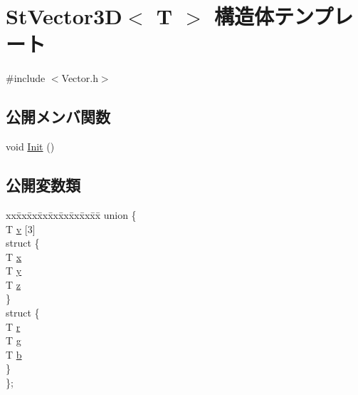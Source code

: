 \hypertarget{struct_st_vector3_d}{}\section{St\+Vector3\+D$<$ T $>$ 構造体テンプレート}
\label{struct_st_vector3_d}


{\ttfamily \#include $<$Vector.\+h$>$}

\subsection*{公開メンバ関数}
\begin{DoxyCompactItemize}
\item 
void \hyperlink{struct_st_vector3_d_a0dfe95d664c3a41ecbe08ffbeff55a46}{Init} ()
\end{DoxyCompactItemize}
\subsection*{公開変数類}
\begin{DoxyCompactItemize}
\item 
\begin{tabbing}
xx\=xx\=xx\=xx\=xx\=xx\=xx\=xx\=xx\=\kill
union \{\\
\>T \hyperlink{struct_st_vector3_d_abcad16bb72da516250165e2a46d29f17}{v} \mbox{[}3\mbox{]}\\
\>struct \{\\
\>\>T \hyperlink{struct_st_vector3_d_ac08f070b42a09572a3734c3dc1fca5d4}{x}\\
\>\>T \hyperlink{struct_st_vector3_d_a74be4b7194542c2f32253527a740cb7c}{y}\\
\>\>T \hyperlink{struct_st_vector3_d_a11281d3c31dddad00b05b8d1e310af53}{z}\\
\>\} \\
\>struct \{\\
\>\>T \hyperlink{struct_st_vector3_d_a89a320b15b55906565a8bf6c3c3cfc8a}{r}\\
\>\>T \hyperlink{struct_st_vector3_d_a1a53ba6fefeaa669bc00390844b714fd}{g}\\
\>\>T \hyperlink{struct_st_vector3_d_a67b650387a16cefefde3932b38b7e6a2}{b}\\
\>\} \\
\}; \\

\end{tabbing}\end{DoxyCompactItemize}


